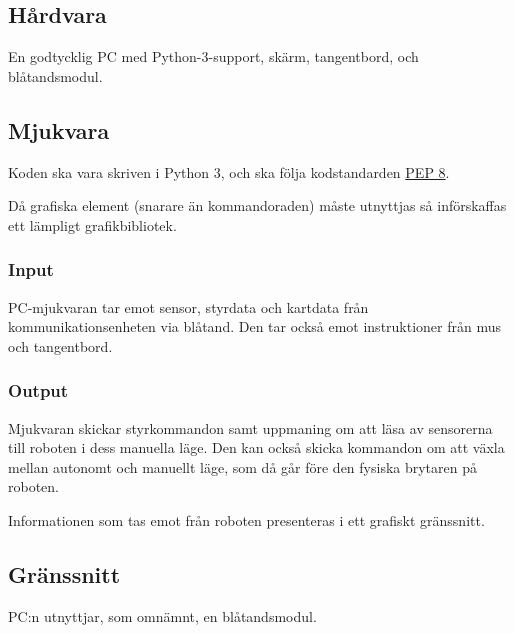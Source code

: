 \documentclass[a4paper,11pt]{article}
\begin{document}
\subsection{Hårdvara}
En godtycklig PC med Python-3-support, skärm, tangentbord, och blåtandsmodul.

\subsection{Mjukvara}

Koden ska vara skriven i Python 3, och ska följa kodstandarden \href{https://www.python.org/dev/peps/pep-0008/}{PEP 8}.

Då grafiska element (snarare än kommandoraden) måste utnyttjas så införskaffas ett lämpligt grafikbibliotek.

\subsubsection{Input}
PC-mjukvaran tar emot sensor, styrdata och kartdata från kommunikationsenheten via blåtand. Den tar också emot instruktioner från mus och tangentbord. 

\subsubsection{Output}
Mjukvaran skickar styrkommandon samt uppmaning om att läsa av sensorerna till roboten i dess manuella läge. Den kan också skicka kommandon om att växla mellan autonomt och manuellt läge, som då går före den fysiska brytaren på roboten.

Informationen som tas emot från roboten presenteras i ett grafiskt gränssnitt.

\subsection{Gränssnitt} \label{ssec:PCInterface}

PC:n utnyttjar, som omnämnt, en blåtandsmodul.
\end{document}
